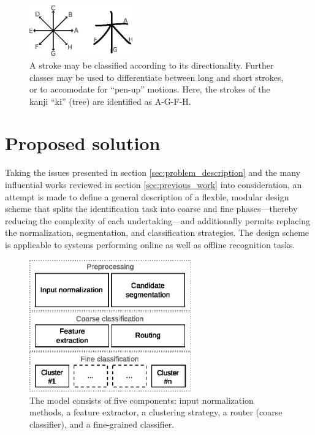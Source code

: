 \documentclass[10pt,conference,a4paper]{IEEEtran}
\begin{document}
	\begin{figure}
		\centering
		\includegraphics[width=1.75in]{./fig/stroke-categories.eps}
		\caption{A stroke may be classified according to its directionality.
			Further classes may be used to differentiate between long and short strokes,
		or to accomodate for ``pen-up'' motions. Here, the strokes of the kanji ``ki'' (tree) are identified as A-G-F-H.}
		\label{fig_stroke_categories}
	\end{figure}



	\section{Proposed solution}
	\label{sec:proposed_solution}

	Taking the issues presented in section \ref{sec:problem_description} and the many influential works reviewed in section \ref{sec:previous_work}
	into consideration, an attempt is made to define a general description of a flexble, modular 
	design scheme that splits the identification task into coarse and fine phases---thereby reducing the complexity of each undertaking---and 
	additionally permits replacing the normalization, segmentation, and classification strategies. %
	The design scheme is applicable to systems performing online as well as offline recognition tasks.

	\begin{figure}[b]
		\centering
		\includegraphics[width=2.75in]{./fig/model-overview.eps}
		\caption{The model consists of five components: input normalization methods, a feature extractor,
			a clustering strategy, a router (coarse classifier), and a fine-grained classifier.}
		\label{fig_model_overview}
	\end{figure}
\end{document}
